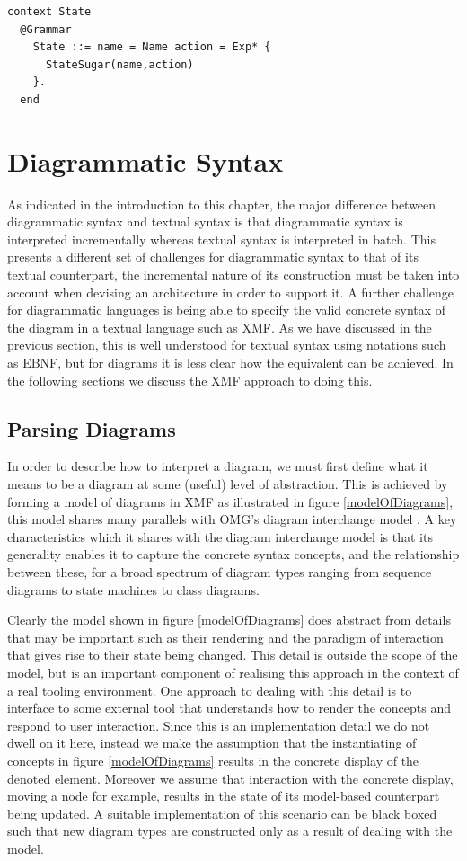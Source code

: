 \begin{lstlisting}
context State
  @Grammar
    State ::= name = Name action = Exp* {
      StateSugar(name,action)
    }.
  end
\end{lstlisting}
\section{Diagrammatic Syntax}

As indicated in the introduction to this chapter, the major difference between diagrammatic syntax and textual syntax is that diagrammatic syntax is interpreted incrementally whereas textual syntax is interpreted in batch.  This presents a different set of challenges for diagrammatic syntax to that of its textual counterpart, the incremental nature of its construction must be taken into account when devising an architecture in order to support it.  A further challenge for diagrammatic languages is being able to specify the valid concrete syntax of the diagram in a
textual language such as XMF.  As we have discussed in the previous section, this is well understood for textual syntax using notations such as EBNF, but for diagrams it is less clear how the equivalent can be achieved.  In the following sections we discuss the XMF approach to doing this.

\subsection{Parsing Diagrams}

In order to describe how to interpret a diagram, we must first define what it means to be a diagram at some (useful) level of abstraction.  This is achieved by forming a model of diagrams in XMF as illustrated in figure \ref{modelOfDiagrams}, this model shares many parallels with OMG's diagram interchange model \cite{}. A key characteristics which it shares with the diagram interchange model is that its generality enables it to capture the concrete syntax concepts, and the relationship between these, for a broad spectrum of diagram types ranging from  sequence diagrams to state machines to class diagrams.

Clearly the model shown in figure \ref{modelOfDiagrams} does abstract from details that may be important such as their rendering and the paradigm of interaction that gives rise to their state being changed.  This detail is outside the scope of the model, but is an important component of realising this approach in the context of a real tooling environment.  One approach to dealing with this detail is to interface to some external tool that understands how
to render the concepts and respond to user interaction.  Since this is an implementation detail we do not dwell on it here, instead we make the assumption that the instantiating of concepts in figure \ref{modelOfDiagrams} results in the concrete display of the denoted element.  Moreover we assume that interaction with the concrete display, moving a node for example, results in the state of its model-based counterpart being updated.  A suitable implementation of this scenario can be black boxed such that new diagram types are constructed only as a result of dealing with the model.

